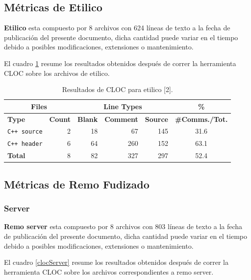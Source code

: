 \subsection{Métricas de Etilico}
\par \textbf{Etilico} esta compuesto por 8 archivos con 624 líneas de texto a la fecha de publicación del presente documento, dicha cantidad puede variar en el tiempo debido a posibles modificaciones, extensiones o mantenimiento.

\par El cuadro \ref{clocEtilico} resume los resultados obtenidos después de correr la herramienta CLOC sobre los archivos de etilico.

\begin{table}[!htf]
    \begin{center}
    \begin{tabular}{|l|r|r|r|r|c|}
    \hline
    \multicolumn{2}{|c|}{Files} & \multicolumn{3}{|c|}{Line Types} & \hspace{0.2cm}\% \\
    \hline
    \textbf{Type} & \textbf{Count} & \textbf{Blank} & \textbf{Comment} & \textbf{Source} & \small{\textbf{\#Comms./Tot.}}\\
    \hline
    \texttt{C++ source} & 2 & 18 & 67 & 145 & 31.6 \\
    \hline
    \texttt{C++ header} & 6 & 64 & 260 & 152 & 63.1 \\
    \hline
    \textbf{Total}      & 8 & 82 & 327 & 297 & 52.4 \\
    \hline
    \end{tabular}
    \caption{Resultados de CLOC para etilico [2].}
    \label{clocEtilico}
    \end{center}
\end{table}

\subsection{Métricas de Remo Fudizado}
\subsubsection{Server}
\par \textbf{Remo server} esta compuesto por 8 archivos con 803 líneas de texto a la fecha de publicación del presente documento, dicha cantidad puede variar en el tiempo debido a posibles modificaciones, extensiones o mantenimiento.

\par El cuadro \ref{clocServer} resume los resultados obtenidos después de correr la herramienta CLOC sobre los archivos correspondientes a remo server.

